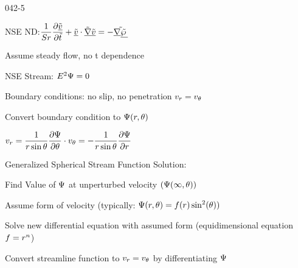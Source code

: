 \begin{mitframe}{042-5}

\item NSE ND:$\dfrac{1}{\strouhal}\dfrac{\partial\uline{\tilde{\vvel}}}{\partial\tilde{t}}+\uline{\tilde{\vvel}}\cdot\tilde{\gradop}\uline{\tilde{\vvel}}=-\tilde{\gradop\uline{\tilde{\dynpress}}}$

		  			\begin{listtwo}
           		   				  \item Assume steady flow, no t dependence
               		 \end{listtwo}
\item NSE Stream: $\energy^2\streamfunc=0$
\item Boundary conditions: no slip, no penetration $\vvel_{\pos}=\vvel_{\theta}$
\item Convert boundary condition to $\streamfunc(\pos,\theta)$
	 				\begin{listtwo}
     	         				  \item $\vvel_{\pos}=\dfrac{1}{\pos\sin\theta}\dfrac{\partial\streamfunc}{\partial\theta}\cdot\vvel_{\theta}=-\dfrac{1}{\pos\sin\theta}\dfrac{\partial\streamfunc}{\partial\pos}$
                
	                \end{listtwo}
\item Generalized Spherical Stream Function Solution:

				\begin{listtwo}
               				 \item Find Value of $\streamfunc$ at unperturbed velocity $(\streamfunc(\infty,\theta))$
             			   \item Assume form of velocity (typically:
                $\streamfunc(\pos,\theta)=\fug(\pos)\sin^2(\theta))$
       			         \item Solve new differential equation with assumed form (equidimensional equation $\fug=\pos^n$)
                \end{listtwo}
Convert streamline function to $\vvel_{\pos}=\vvel_{\theta}$
by differentiating $\streamfunc$

\end{mitframe}